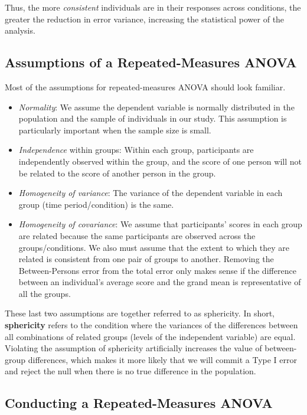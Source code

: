 \documentclass[
  letterpaper,
  DIV=11,
  numbers=noendperiod]{scrreprt}
\begin{document}
Thus, the more \emph{consistent} individuals are in their responses
across conditions, the greater the reduction in error variance,
increasing the statistical power of the analysis.

\subsection{Assumptions of a Repeated-Measures
ANOVA}\label{assumptions-of-a-repeated-measures-anova}

Most of the assumptions for repeated-measures ANOVA should look
familiar.

\begin{itemize}
\item
  \emph{Normality}: We assume the dependent variable is normally
  distributed in the population and the sample of individuals in our
  study. This assumption is particularly important when the sample size
  is small.
\item
  \emph{Independence} within groups: Within each group, participants are
  independently observed within the group, and the score of one person
  will not be related to the score of another person in the group.
\item
  \emph{Homogeneity of variance}: The variance of the dependent variable
  in each group (time period/condition) is the same.
\item
  \emph{Homogeneity of covariance}: We assume that participants' scores
  in each group are related because the same participants are observed
  across the groups/conditions. We also must assume that the extent to
  which they are related is consistent from one pair of groups to
  another. Removing the Between-Persons error from the total error only
  makes sense if the difference between an individual's average score
  and the grand mean is representative of all the groups.
\end{itemize}

These last two assumptions are together referred to as sphericity. In
short, \textbf{sphericity} refers to the condition where the variances
of the differences between all combinations of related groups (levels of
the independent variable) are equal. Violating the assumption of
sphericity artificially increases the value of between-group
differences, which makes it more likely that we will commit a Type I
error and reject the null when there is no true difference in the
population.

\subsection{Conducting a Repeated-Measures
ANOVA}\label{conducting-a-repeated-measures-anova}
\end{document}
